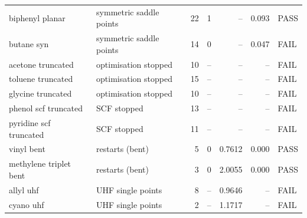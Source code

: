 \begin{tabular}{llrrrrl}
biphenyl planar & symmetric saddle points & 22 & 1 & -- & 0.093 & PASS \\
butane syn & symmetric saddle points & 14 & 0 & -- & 0.047 & FAIL \\
acetone truncated & optimisation stopped & 10 & -- & -- & -- & FAIL \\
toluene truncated & optimisation stopped & 15 & -- & -- & -- & FAIL \\
glycine truncated & optimisation stopped & 10 & -- & -- & -- & FAIL \\
phenol scf truncated & SCF stopped & 13 & -- & -- & -- & FAIL \\
pyridine scf truncated & SCF stopped & 11 & -- & -- & -- & FAIL \\
vinyl bent & restarts (bent) & 5 & 0 & 0.7612 & 0.000 & PASS \\
methylene triplet bent & restarts (bent) & 3 & 0 & 2.0055 & 0.000 & PASS \\
allyl uhf & UHF single points & 8 & -- & 0.9646 & -- & FAIL \\
cyano uhf & UHF single points & 2 & -- & 1.1717 & -- & FAIL \\
\bottomrule
\end{tabular}

